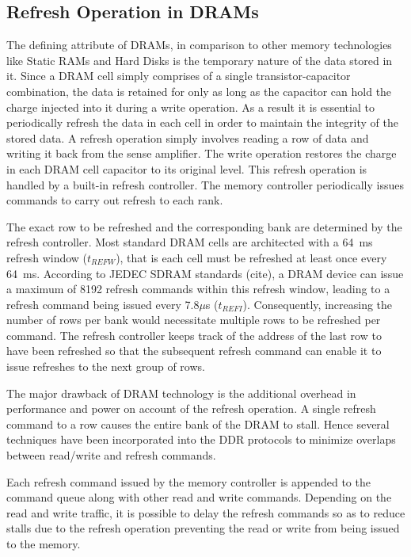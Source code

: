 \subsection{Refresh Operation in DRAMs}
The defining attribute of DRAMs, in comparison to other memory technologies like Static RAMs and Hard Disks is the temporary nature of the data stored in it. Since a DRAM cell simply comprises of a single transistor-capacitor combination, the data is retained for only as long as the capacitor can hold the charge injected into it during a write operation. As a result it is essential to periodically refresh the data in each cell in order to maintain the integrity of the stored data. A refresh operation simply involves reading a row of data and writing it back from the sense amplifier. The write operation restores the charge in each DRAM cell capacitor to its original level. This refresh operation is handled by a built-in refresh controller. The memory controller periodically issues commands to carry out refresh to each rank.

The exact row to be refreshed and the corresponding bank are determined by the refresh controller. Most standard DRAM cells are architected with a 64~ms refresh window ($t_{REFW}$), that is each cell must be refreshed at least once every 64~ms. According to JEDEC SDRAM standards (cite), a DRAM device can issue a maximum of 8192 refresh commands within this refresh window, leading to a refresh command being issued every 7.8$\mu$s ($t_{REFI}$). Consequently, increasing the number of rows per bank would necessitate multiple rows to be refreshed per command. The refresh controller keeps track of the address of the last row to have been refreshed so that the subsequent refresh command can enable it to issue refreshes to the next group of rows.

The major drawback of DRAM technology is the additional overhead in performance and power on account of the refresh operation. A single refresh command to a row causes the entire bank of the DRAM to stall. Hence several techniques have been incorporated into the DDR protocols to minimize overlaps between read/write and refresh commands.

Each refresh command issued by the memory controller is appended to the command queue along with other read and write commands. Depending on the read and write traffic, it is possible to delay the refresh commands so as to reduce stalls due to the refresh operation preventing the read or write from being issued to the memory. 

